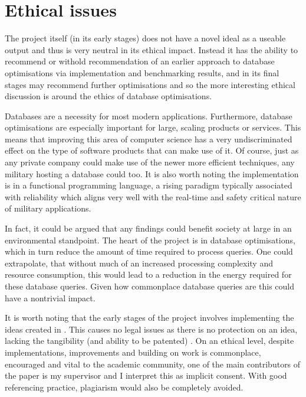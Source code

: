 \chapter{Ethical issues} %
\begin{comment}
What are the wider ethical, legal, professional and societal issues surrounding your project and the accompanying research? You should use the ethics checklist as the basis for this discussion. 
\end{comment}
The project itself (in its early stages) does not have a novel ideal as a useable output and thus is very neutral in its ethical impact. Instead it has the ability to recommend or withold recommendation of an earlier approach to database optimisations via implementation and benchmarking results, and in its final stages may recommend further optimisations and so the more interesting ethical discussion is around the ethics of database optimisations.

Databases are a necessity for most modern applications. Furthermore, database optimisations are especially important for large, scaling products or services. This means that improving this area of computer science has a very undiscriminated effect on the type of software products that can make use of it. Of course, just as any private company could make use of the newer more efficient techniques, any military hosting a database could too. It is also worth noting the implementation is in a functional programming language, a rising paradigm  typically associated with reliability   which aligns very well with the real-time and safety critical nature of military applications. 

In fact, it could be argued that any findings could benefit society at large in an environmental standpoint. The heart of the project is in database optimisations, which in turn reduce the amount of time required to process queries.  One could extrapolate, that without much of an increased processing complexity and resource consumption, this would lead to a reduction in the energy required for these database queries. Given how commonplace database queries are  this could have a nontrivial impact.

It is worth noting that the early stages of the project involves implementing the ideas created in \cite{RelationalAlgebraByWayOfAdjunctions}. This causes no legal issues as there is no protection on an idea, lacking the tangibility (and ability to be patented) . On an ethical level, despite implementations, improvements and building on work is commonplace, encouraged and vital to the academic community, one of the main contributors of the paper is my supervisor and I interpret this as implicit consent. With good referencing practice, plagiarism would also be completely avoided.

